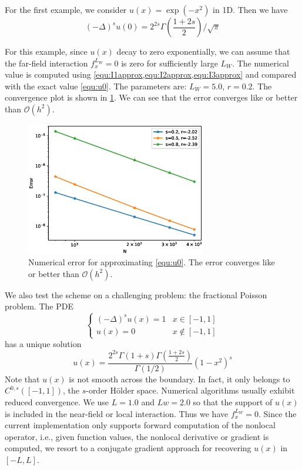 \documentclass[3p,,preprint,12pt]{elsarticle}
\theoremstyle{definition}
\begin{document}
For the first example, we consider $u(x)=\exp(-x^2)$ in 1D. Then we have~\cite{huang2016finite}
\begin{equation}\label{equ:u0}
	(-\Delta)^s u(0) = 2^{2s}\Gamma\left( \frac{1+2s}{2} \right)/\sqrt{\pi}
\end{equation}

For this example, since $u(x)$ decay to zero exponentially, we can assume that the far-field interaction $f^{L_W}_x=0$ is zero for sufficiently large $L_W$. The numerical value is computed using \cref{equ:I1approx,equ:I2approx,equ:I3approx} and compared with the exact value \cref{equ:u0}. The parameters are: $L_W=5.0$, $r=0.2$. The convergence plot is shown in \cref{fig:fig5}. We can see that the error converges like or better than $\mathcal{O}(h^2)$. 

\begin{figure}[H] %
\centering
\includegraphics[width=0.7\textwidth,keepaspectratio]{figures/fig5}
\caption{Numerical error for approximating \cref{equ:u0}. The error converges like or better than $\mathcal{O}(h^2)$.}
\label{fig:fig5}
\end{figure}

We also test the scheme on a challenging problem: the fractional Poisson problem. The PDE
\begin{equation}
	\begin{cases}
		(-\Delta)^s u(x) = 1 & x\in [-1,1]\\
		u(x) = 0 & x\not\in [-1,1]
	\end{cases}
\end{equation}
has a unique solution
\begin{equation}
	u(x) = \frac{2^{2s}\Gamma(1+s)\Gamma\left( \frac{1+2s}{2} \right) }{\Gamma(1/2)} (1-x^2)^s
\end{equation}
Note that $u(x)$ is not smooth across the boundary. In fact, it only belongs to $C^{0,s}([-1,1])$, the $s$-order H\"older space. Numerical algorithms usually exhibit reduced convergence.  We use $L=1.0$ and $Lw=2.0$ so that the support of $u(x)$ is included in the near-field or local interaction. Thus we have $f_x^{L_W}=0$. Since the current implementation only supports forward computation of the nonlocal operator, i.e., given function values, the nonlocal derivative or gradient is computed, we resort to a conjugate gradient approach for recovering $u(x)$ in $[-L,L]$. 
\end{document}
